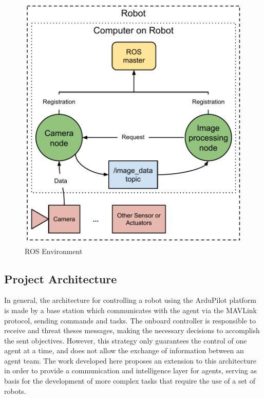 \begin{figure}
  \centering
  \includegraphics[width=0.9\columnwidth]{img/ros_environment.pdf}
  \caption{ROS Environment}
  \label{fig:ros_environment}
\end{figure}


\subsection{Project Architecture} %
\label{sub:architecture}

In general, the architecture for controlling a robot using the ArduPilot platform is made by a base station which communicates with the agent via the MAVLink protocol, sending commands and tasks.
The onboard controller is responsible to receive and threat theses messages, making the necessary decisions to accomplish the sent objectives.
However, this strategy only guarantees the control of one agent at a time, and does not allow the exchange of information between an agent team.
The work developed here proposes an extension to this architecture in order to provide a communication and intelligence layer for agents, serving as basis for the development of more complex tasks that require the use of a set of robots.

